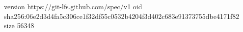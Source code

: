 version https://git-lfs.github.com/spec/v1
oid sha256:06e2d3d4fa5c306ce1f32df55c0532b4204f3d402c683e91373755dbe4171f82
size 56348
